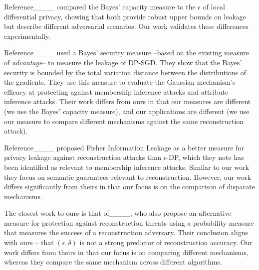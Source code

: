  Reference____ compared the Bayes' capacity measure to the $\epsilon$ of local differential privacy, showing that both provide robust upper bounds on leakage but describe different adversarial scenarios. Our work validates these differences experimentally.

Reference____ used a Bayes' security measure --based on the existing measure of \emph{advantage}-- to measure the leakage of DP-SGD. They show that the Bayes' security is bounded by the total variation distance between the distributions of the gradients. They use this measure to evaluate the Gaussian mechanism's efficacy at protecting against membership inference attacks and attribute inference attacks. Their work differs from ours in that our measures are different (we use the Bayes' capacity measure), and our applications are different (we use our measure to compare different mechanisms against the same reconstruction attack).

Reference____ proposed Fisher Information Leakage as a better measure for privacy leakage against reconstruction attacks than $\epsilon$-DP, which they note has been identified as relevant to membership inference attacks. Similar to our work they focus on semantic guarantees relevant to reconstruction. However, our work differs significantly from theirs in that our focus is on the comparison of disparate mechanisms. 


The closest work to ours is that of____, who also propose an alternative measure for protection against reconstruction threats using a probability measure that measures the success of a reconstruction adversary. Their conclusion aligns with ours -- that $(\epsilon, \delta)$ is not a strong predictor of reconstruction accuracy. Our work differs from theirs in that our focus is on comparing different mechanisms, whereas they compare the same mechanism across different algorithms.